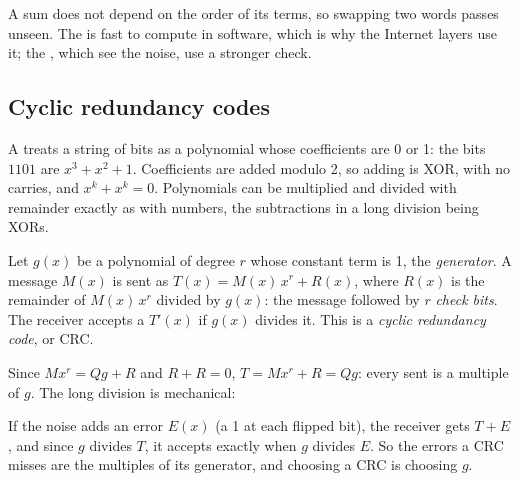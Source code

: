 

A sum does not depend on the order of its terms, so swapping two words passes unseen. The  is fast to compute
in software, which is why the Internet layers use it; the , which see the noise, use a stronger check.

\subsection{Cyclic redundancy codes}

A  treats a string of bits as a polynomial whose coefficients are 0 or 1: the bits $1101$ are
$x^3 + x^2 + 1$. Coefficients are added modulo 2, so adding is XOR, with no carries, and $x^k + x^k = 0$. Polynomials
can be multiplied and divided with remainder exactly as with numbers, the subtractions in a long division being XORs.

\begin{definition}\label{def:b2:link-layer:crc}
Let $g(x)$ be a polynomial of degree $r$ whose constant term is 1, the \emph{generator}. A message $M(x)$ is sent as
$T(x) = M(x)\,x^r + R(x)$, where $R(x)$ is the remainder of $M(x)\,x^r$ divided by $g(x)$: the message followed by
$r$ \emph{check bits}. The receiver accepts a  $T'(x)$ if $g(x)$ divides it. This is a \emph{cyclic redundancy
code}, or CRC.
\end{definition}

Since $M x^r = Q g + R$ and $R + R = 0$, $T = M x^r + R = Q g$: every  sent is a multiple of $g$. The long
division is mechanical:


\label{lst:b2:link-layer:remainder}

If the noise adds an error $E(x)$ (a 1 at each flipped bit), the receiver gets $T + E$, and since $g$ divides $T$, it
accepts exactly when $g$ divides $E$. So the errors a CRC misses are the multiples of its generator, and choosing a
CRC is choosing $g$.

